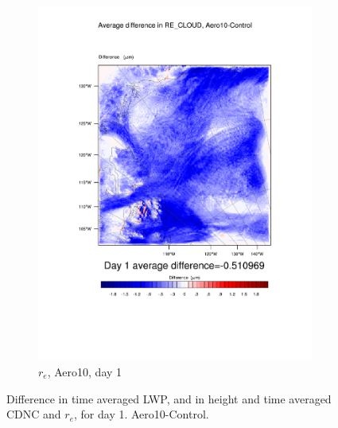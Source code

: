 \begin{figure}[hb]
	\begin{subfigure}{0.40\textwidth}
		\centering
		\includegraphics[width=\textwidth]{results/aero10/diff_Aero10_RE_CLOUD_Day1.pdf}
		\caption{$r_e$, Aero10, day 1}
		\label{subfig:recloud_r3Day1}
	\end{subfigure}
\caption{Difference in time averaged LWP, and in height and time averaged CDNC and $r_e$, for day 1. Aero10-Control.}
\label{fig:lwpcdncre_r3Day1}
\end{figure}

